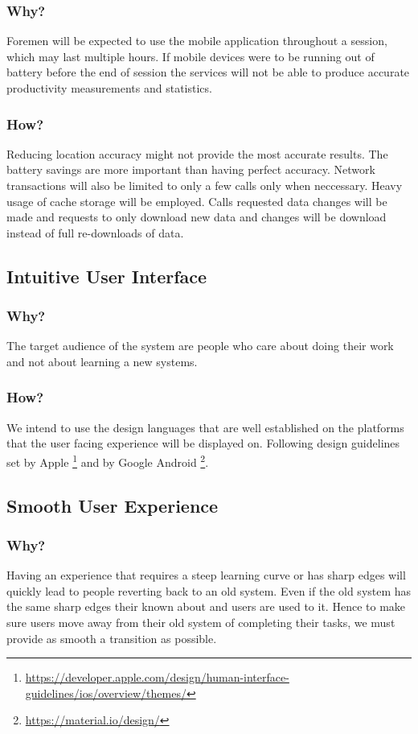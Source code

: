 \documentclass[11pt]{article}
\begin{document}
\subsubsection{Why?}
Foremen will be expected to use the mobile application throughout a session, which may last multiple hours. If mobile devices were to be running out of battery before the end of session the services will not be able to produce accurate productivity measurements and statistics.

\subsubsection{How?}
Reducing location accuracy might not provide the most accurate results. The battery savings are more important than having perfect accuracy. Network transactions will also be limited to only a few calls only when neccessary. Heavy usage of cache storage will be employed. Calls requested data changes will be made and requests to only download new data and changes will be download instead of full re-downloads of data.

\subsection{Intuitive User Interface}

\subsubsection{Why?}
The target audience of the system are people who care about doing their work and not about learning a new systems.

\subsubsection{How?}
We intend to use the design languages that are well established on the platforms that the user facing experience will be displayed on. Following design guidelines set by Apple \footnote{\url{https://developer.apple.com/design/human-interface-guidelines/ios/overview/themes/}} and by Google Android \footnote{\url{https://material.io/design/}}.

\subsection{Smooth User Experience}

\subsubsection{Why?}
Having an experience that requires a steep learning curve or has sharp edges will quickly lead to people reverting back to an old system. Even if the old system has the same sharp edges their known about and users are used to it. Hence to make sure users move away from their old system of completing their tasks, we must provide as smooth a transition as possible.
\end{document}
